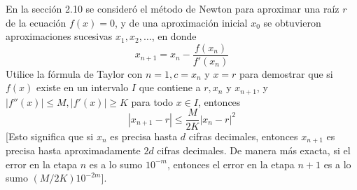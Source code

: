 \item En la sección 2.10 se consideró el método de Newton para aproximar una raíz $r$ de la ecuación $f(x) = 0$, y de una aproximación inicial $x_0$ se obtuvieron aproximaciones sucesivas $x_1, x_2, \dots$, en donde
    \[ x_{n+1} = x_n - \frac{f(x_n)}{f'(x_n)} \]
    Utilice la fórmula de Taylor con $n = 1, c = x_n$ y $x = r$ para demostrar que si $f(x)$ existe en un intervalo $I$ que contiene a $r, x_n$ y $x_{n+1}$, y $|f''(x)| \le M, |f'(x)| \ge K$ para todo $x \in I$, entonces
    \[ |x_{n+1} - r| \le \frac{M}{2K} |x_n - r|^2 \]
    [Esto significa que si $x_n$ es precisa hasta $d$ cifras decimales, entonces $x_{n+1}$ es precisa hasta aproximadamente $2d$ cifras decimales. De manera más exacta, si el error en la etapa $n$ es a lo sumo $10^{-m}$, entonces el error en la etapa $n+1$ es a lo sumo $(M/2K)10^{-2m}$].
